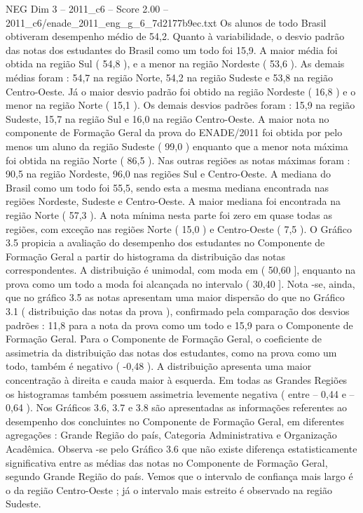 \begin{textsample}{NEG Dim 3 – 2011\_c6 – Score 2.00 – 2011\_c6/enade\_2011\_eng\_g\_6\_7d2177b9ec.txt}
Os alunos de todo Brasil obtiveram desempenho médio de 54,2.
Quanto à variabilidade, o desvio padrão das notas dos estudantes do Brasil como um todo foi 15,9.
A maior média foi obtida na região Sul ( 54,8 ), e a menor na região Nordeste ( 53,6 ).
As demais médias foram : 54,7 na região Norte, 54,2 na região Sudeste e 53,8 na região Centro-Oeste.
Já o maior desvio padrão foi obtido na região Nordeste ( 16,8 ) e o menor na região Norte ( 15,1 ).
Os demais desvios padrões foram : 15,9 na região Sudeste, 15,7 na região Sul e 16,0 na região Centro-Oeste.
A maior nota no componente de Formação Geral da prova do ENADE/2011 foi obtida por pelo menos um aluno da região Sudeste ( 99,0 ) enquanto que a menor nota máxima foi obtida na região Norte ( 86,5 ).
Nas outras regiões as notas máximas foram : 90,5 na região Nordeste, 96,0 nas regiões Sul e Centro-Oeste.
A mediana do Brasil como um todo foi 55,5, sendo esta a mesma mediana encontrada nas regiões Nordeste, Sudeste e Centro-Oeste.
A maior mediana foi encontrada na região Norte ( 57,3 ).
A nota mínima nesta parte foi zero em quase todas as regiões, com exceção nas regiões Norte ( 15,0 ) e Centro-Oeste ( 7,5 ).
O Gráfico 3.5 propicia a avaliação do desempenho dos estudantes no Componente de Formação Geral a partir do histograma da distribuição das notas correspondentes.
A distribuição é unimodal, com moda em ( 50,60 ], enquanto na prova como um todo a moda foi alcançada no intervalo ( 30,40 ].
Nota -se, ainda, que no gráfico 3.5 as notas apresentam uma maior dispersão do que no Gráfico 3.1 ( distribuição das notas da prova ), confirmado pela comparação dos desvios padrões : 11,8 para a nota da prova como um todo e 15,9 para o Componente de Formação Geral.
Para o Componente de Formação Geral, o coeficiente de assimetria da distribuição das notas dos estudantes, como na prova como um todo, também é negativo ( -0,48 ).
A distribuição apresenta uma maior concentração à direita e cauda maior à esquerda.
Em todas as Grandes Regiões os histogramas também possuem assimetria levemente negativa ( entre – 0,44 e – 0,64 ).
Nos Gráficos 3.6, 3.7 e 3.8 são apresentadas as informações referentes ao desempenho dos concluintes no Componente de Formação Geral, em diferentes agregações : Grande Região do país, Categoria Administrativa e Organização Acadêmica.
Observa -se pelo Gráfico 3.6 que não existe diferença estatisticamente significativa entre as médias das notas no Componente de Formação Geral, segundo Grande Região do país.
Vemos que o intervalo de confiança mais largo é o da região Centro-Oeste ; já o intervalo mais estreito é observado na região Sudeste.

\end{textsample}
